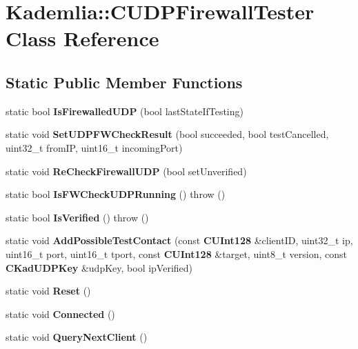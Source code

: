 \section{Kademlia::CUDPFirewallTester Class Reference}
\label{classKademlia_1_1CUDPFirewallTester}
\subsection*{Static Public Member Functions}
\begin{DoxyCompactItemize}
\item 
static bool {\bfseries IsFirewalledUDP} (bool lastStateIfTesting)\label{classKademlia_1_1CUDPFirewallTester_a318aa376fa1f85e98ed042414d9a7662}

\item 
static void {\bfseries SetUDPFWCheckResult} (bool succeeded, bool testCancelled, uint32\_\-t fromIP, uint16\_\-t incomingPort)\label{classKademlia_1_1CUDPFirewallTester_afff8749acf2669591f2ebd7c74b37e9e}

\item 
static void {\bfseries ReCheckFirewallUDP} (bool setUnverified)\label{classKademlia_1_1CUDPFirewallTester_af00f3c7a9c047d1e0c99459529707eae}

\item 
static bool {\bfseries IsFWCheckUDPRunning} ()  throw ()\label{classKademlia_1_1CUDPFirewallTester_afe44b8284b5ef7691c1d9f6a675cc824}

\item 
static bool {\bfseries IsVerified} ()  throw ()\label{classKademlia_1_1CUDPFirewallTester_a9c3d8edbfd94631e88fd7138b657156d}

\item 
static void {\bfseries AddPossibleTestContact} (const {\bf CUInt128} \&clientID, uint32\_\-t ip, uint16\_\-t port, uint16\_\-t tport, const {\bf CUInt128} \&target, uint8\_\-t version, const {\bf CKadUDPKey} \&udpKey, bool ipVerified)\label{classKademlia_1_1CUDPFirewallTester_a8ccf634a394dee76c7f577b4bf72c65d}

\item 
static void {\bfseries Reset} ()\label{classKademlia_1_1CUDPFirewallTester_a25fb27e35cd92638effbe59d3be73dac}

\item 
static void {\bfseries Connected} ()\label{classKademlia_1_1CUDPFirewallTester_a83b3360c233288162b6bb40c537b1cc0}

\item 
static void {\bfseries QueryNextClient} ()\label{classKademlia_1_1CUDPFirewallTester_a25d6f51e7bdde91b5f01a44b7a6c58c9}

\end{DoxyCompactItemize}

